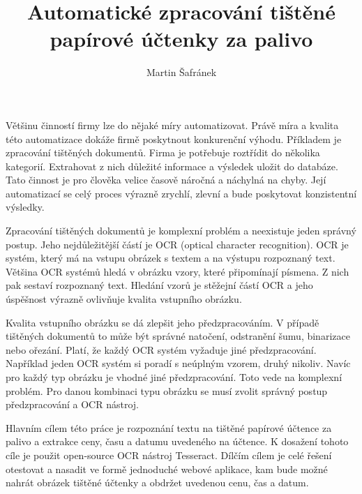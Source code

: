 \documentclass[thesis=B,czech]{FITthesis}[2019/12/23]
\title{Automatické zpracování tištěné papírové účtenky za palivo}
\author{Martin Šafránek} %
\begin{document}
\begin{introduction}
	Většinu činností firmy lze do nějaké míry automatizovat. Právě míra a kvalita této automatizace dokáže firmě poskytnout konkurenční výhodu. Příkladem je zpracování tištěných dokumentů. Firma je potřebuje roztřídit do několika kategorií. Extrahovat z nich důležité informace a výsledek uložit do databáze. Tato činnost je pro člověka velice časově náročná a náchylná na chyby. Její automatizací se celý proces výrazně zrychlí, zlevní a bude poskytovat konzistentní výsledky.

	Zpracování tištěných dokumentů je komplexní problém a neexistuje jeden správný postup. Jeho nejdůležitější částí je OCR (optical character recognition). OCR je systém, který má na vstupu obrázek s textem a na výstupu rozpoznaný text. Většina OCR systémů hledá v obrázku vzory, které připomínají písmena. Z nich pak sestaví rozpoznaný text. Hledání vzorů je stěžejní částí OCR a jeho úspěšnost výrazně ovlivňuje kvalita vstupního obrázku.

	Kvalita vstupního obrázku se dá zlepšit jeho předzpracováním. V případě tištěných dokumentů to může být správné natočení, odstranění šumu, binarizace nebo ořezání. Platí, že každý OCR systém vyžaduje jiné předzpracování. Například jeden OCR systém si poradí s neúplným vzorem, druhý nikoliv. Navíc pro každý typ obrázku je vhodné jiné předzpracování. Toto vede na komplexní problém. Pro danou kombinaci typu obrázku se musí zvolit správný postup předzpracování a OCR nástroj.

	Hlavním cílem této práce je rozpoznání textu na tištěné papírové účtence za palivo a extrakce ceny, času a datumu uvedeného na účtence. K dosažení tohoto cíle je použit open-source OCR nástroj Tesseract. Dílčím cílem je celé řešení otestovat a nasadit ve formě jednoduché webové aplikace, kam bude možné nahrát obrázek tištěné účtenky a obdržet uvedenou cenu, čas a datum.


\end{introduction}
\end{document}
